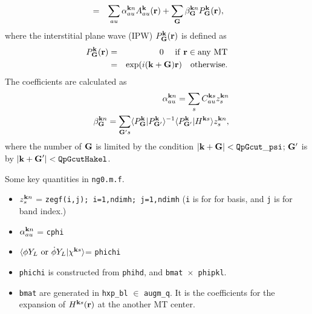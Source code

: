 \documentclass[a4paper,10pt,epsf,fleqn]{article}
\begin{document}
{\begin{eqnarray}
&=& \sum_{a u} \alpha^{{\bf k} n}_{au} A^{\bf k}_{a u}({\bf r})
 + \sum_{\bf G} \beta^{{\bf k}n}_{\bf G} P^{\bf k}_{\bf G}({\bf r}),
\end{eqnarray}
where the interstitial plane wave (IPW) $P^{\bf k}_{\bf G}({\bf r})$ 
is defined as
\begin{eqnarray}
P^{\bf k}_{\bf G}({\bf r}) &=& 0  \ \ \ {\rm \ if \ {\bf r} \in any \ MT} \nonumber \\
        &=&   \exp (i ({\bf k+G}) {\bf r}) \ \ \ {\rm otherwise}.
\end{eqnarray}
The coefficients are calculated as
\begin{eqnarray}
&&\alpha^{{\bf k} n}_{au} = \sum_s C^{{\bf k}s}_{a u} z^{{\bf k}n}_s \\
&&\beta^{{\bf k}n}_{\bf G} = \sum_{{\bf G}'s} 
\langle P^{\bf k}_{\bf G}|P^{\bf k}_{{\bf G}'}\rangle^{-1}
\langle P^{\bf k}_{{\bf G}'}|H^{{\bf k}s}\rangle z^{{\bf k}n}_s,
\end{eqnarray}
where the number of ${\bf G}$ is limited by the condition
$|{\bf k+G}|< {\tt QpGcut\_psi}$;
${\bf G}'$ is by $|{\bf k+G}'|< {\tt  QpGcutHakel}$.

\vspace{8mm}
\noindent Some key quantities in {\tt ng0.m.f}.
\begin{itemize}
\item 
$z^{{\bf k}n}_s$ = {\tt zegf(i,j); i=1,ndimh; {\tt j=1,ndimh}} 
({\tt i} is for for basis, and {\tt j} is for band index.)
	
\item 
$\alpha^{{\bf k} n}_{au}$ = {\tt cphi}

\item
$\langle \phi Y_L {\ \rm or \ } \dot{\phi}Y_L|\chi^{{\bf k}s} \rangle$= {\tt phichi} 
	
\item 
{\tt phichi} is constructed from {\tt phihd}, and {\tt bmat $\times$ phipkl}.

\item 
{\tt bmat} are generated in {\tt hxp\_bl} $\in$ {\tt augm\_q}.
It is the coefficients for the expansion of $H^{{\bf k}s}({\bf r})$ 
at the another MT center.

\end{itemize}


\noindent [ In {\tt ng0.m.f}, ${\tt QpGcutHakel}$ is assumed as $={\tt 1.5*QpGcut\_psi}$ now.
{\underline But it is not justified enough.}
You will be able to utilize more reasonable ones
which was used in the LDA calculations.]

}
\end{document}
